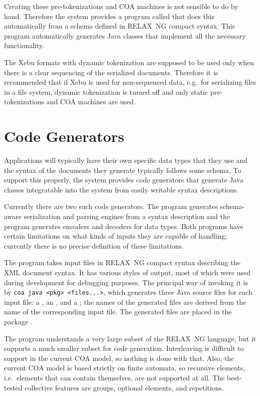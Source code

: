 \documentclass[draft]{article}
\begin{document}
Creating these pre-tokenizations and COA machines is not sensible to
do by hand.  Therefore the system provides a program called 
that does this automatically from a schema defined in RELAX~NG compact
syntax.  This program automatically generates Java classes that
implement all the necessary functionality.

The Xebu formats with dynamic tokenization are supposed to be used
only when there is a clear sequencing of the serialized documents.
Therefore it is recommended that if Xebu is used for non-sequenced
data, e.g.\ for serializing files in a file system, dynamic
tokenization is turned off and only static pre\hyp{}tokenizations and COA
machines are used.

\section{Code Generators}

Applications will typically have their own specific data types that
they use and the syntax of the documents they generate typically
follows some schema.  To support this properly, the system provides
code generators that generate Java classes integratable into the
system from easily writable syntax descriptions.

Currently there are two such code generators.  The program 
generates schema-aware serialization and parsing engines from a syntax
description and the program  generates encoders and
decoders for data types.  Both programs have certain limitations on
what kinds of inputs they are capable of handling; currently there is
no precise definition of these limitations.

The program  takes input files in RELAX~NG compact syntax
describing the XML document syntax.  It has various styles of output,
most of which were used during development for debugging purposes.
The principal way of invoking it is by \texttt{coa java <pkg>
  <files...>}, which generates three Java source files for each input
file: a , an , and a
; the names of the generated files are derived from
the name of the corresponding input file.  The generated files are
placed in the package .

The  program understands a very large subset of the RELAX~NG
language, but it supports a much smaller subset for code generation.
Interleaving is difficult to support in the current COA model, so
nothing is done with that.  Also, the current COA model is based
strictly on finite automata, so recursive elements, i.e.\ elements
that can contain themselves, are not supported at all.  The
best-tested collective features are groups, optional elements, and
repetitions.
\end{document}
